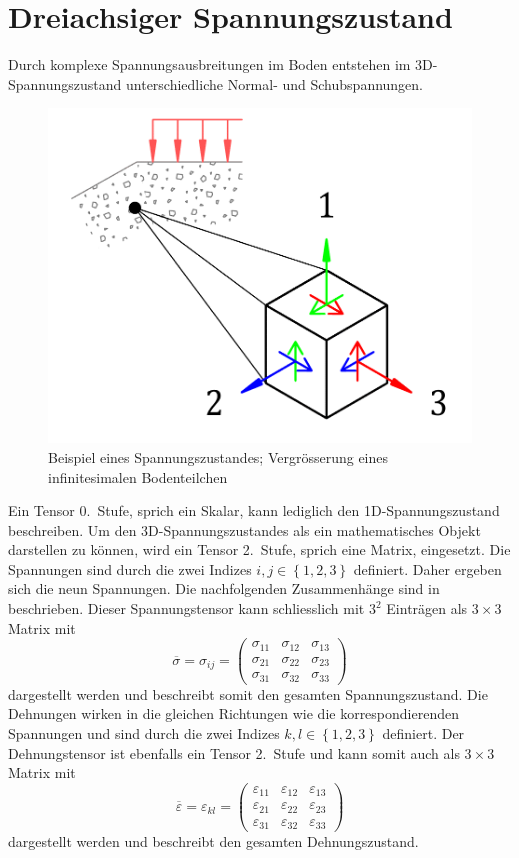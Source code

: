 \section{Dreiachsiger Spannungszustand\label{spannung:section:Dreiachsiger_Spannungszustand}}
Durch komplexe Spannungsausbreitungen im Boden entstehen im 3D-Spannungszustand unterschiedliche Normal- und Schubspannungen.
\begin{figure}
	\centering
	\includegraphics[width=0.30\linewidth,keepaspectratio]{papers/spannung/Grafiken/infinitesimalerWuerfel.png}
	\caption{Beispiel eines Spannungszustandes; Vergrösserung eines infinitesimalen Bodenteilchen}
	\label{fig:infinitesimalerWuerfel}
\end{figure}
Ein Tensor 0.~Stufe, sprich ein Skalar, kann lediglich den 1D-Spannungszustand beschreiben.
Um den 3D-Spannungszustandes als ein mathematisches Objekt darstellen zu können, wird ein Tensor 2.~Stufe, sprich eine Matrix, eingesetzt.
Die Spannungen sind durch die zwei Indizes
\(
i, j\in\left\{1, 2, 3\right\}
\)
definiert.
Daher ergeben sich die neun Spannungen.
Die nachfolgenden Zusammenhänge sind in \cite{spannung:Voigtsche-Notation} beschrieben.
Dieser Spannungstensor kann schliesslich mit $3^2$ Einträgen als $3\times3$ Matrix mit
\[
\overline{\sigma}
=
\sigma_{ij}
=
\begin{pmatrix}
	\sigma_{11} & \sigma_{12} & \sigma_{13} \\ 
	\sigma_{21} & \sigma_{22} & \sigma_{23} \\
	\sigma_{31} & \sigma_{32} & \sigma_{33}
\end{pmatrix}
\]
dargestellt werden und beschreibt somit den gesamten Spannungszustand.
Die Dehnungen wirken in die gleichen Richtungen wie die korrespondierenden Spannungen und sind durch die zwei Indizes
\(
k, l\in\left\{1, 2, 3\right\}
\)
definiert.
Der Dehnungstensor ist ebenfalls ein Tensor 2.~Stufe und kann somit auch als $3\times3$ Matrix mit
\[
\overline{\varepsilon}
=
\varepsilon_{kl}
=
\begin{pmatrix}
	\varepsilon_{11} & \varepsilon_{12} & \varepsilon_{13} \\ 
	\varepsilon_{21} & \varepsilon_{22} & \varepsilon_{23} \\
	\varepsilon_{31} & \varepsilon_{32} & \varepsilon_{33}
\end{pmatrix}
\]
dargestellt werden und beschreibt den gesamten Dehnungszustand.

